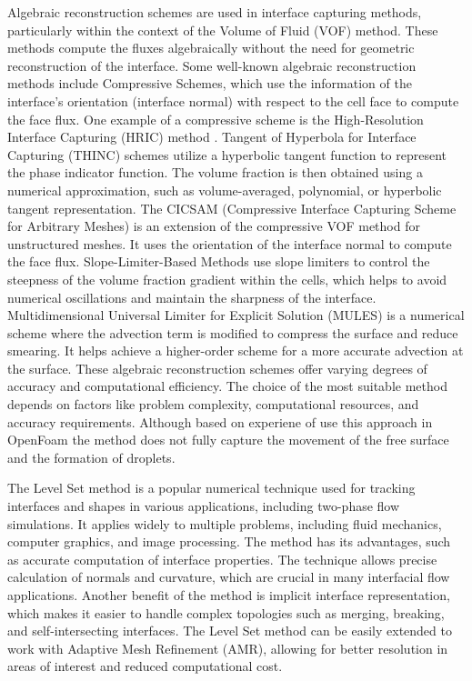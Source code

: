 Algebraic reconstruction schemes are used in interface capturing methods, particularly within the context of the Volume of Fluid (VOF) method. These methods compute the fluxes algebraically without the need for geometric reconstruction of the interface. Some well-known algebraic reconstruction methods include Compressive Schemes, which use the information of the interface's orientation (interface normal) with respect to the cell face to compute the face flux. One example of a compressive scheme is the High-Resolution Interface Capturing (HRIC) method \cite{HIRC}. Tangent of Hyperbola for Interface Capturing (THINC) \cite{THINC} schemes utilize a hyperbolic tangent function to represent the phase indicator function. The volume fraction is then obtained using a numerical approximation, such as volume-averaged, polynomial, or hyperbolic tangent representation. The CICSAM (Compressive Interface Capturing Scheme for Arbitrary Meshes)\cite{CICSAM} is an extension of the compressive VOF method for unstructured meshes. It uses the orientation of the interface normal to compute the face flux. Slope-Limiter-Based Methods \cite{liu2021new} use slope limiters to control the steepness of the volume fraction gradient within the cells, which helps to avoid numerical oscillations and maintain the sharpness of the interface. Multidimensional Universal Limiter for Explicit Solution (MULES)\cite{MULES} is a numerical scheme where the advection term is modified to compress the surface and reduce smearing. It helps achieve a higher-order scheme for a more accurate advection at the surface. These algebraic reconstruction schemes offer varying degrees of accuracy and computational efficiency. The choice of the most suitable method depends on factors like problem complexity, computational resources, and accuracy requirements. Although based on experiene of use this approach in OpenFoam \cite{roenby2019isoadvector} the method does not fully capture the movement of the free surface and the formation of droplets.

The Level Set method is a popular numerical technique used for tracking interfaces and shapes in various applications, including two-phase flow simulations. It applies widely to multiple problems, including fluid mechanics, computer graphics, and image processing. The method has its advantages, such as accurate computation of interface properties. The technique allows precise calculation of normals and curvature, which are crucial in many interfacial flow applications. Another benefit of the method is implicit interface representation, which makes it easier to handle complex topologies such as merging, breaking, and self-intersecting interfaces. The Level Set method can be easily extended to work with Adaptive Mesh Refinement (AMR), allowing for better resolution in areas of interest and reduced computational cost.

